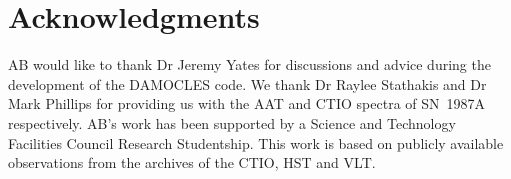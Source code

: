 \documentclass[useAMS,usenatbib,usegraphicx]{mnras}
\begin{document}
%
%
%
%
%
%
%
\section*{Acknowledgments}

AB would like to thank Dr Jeremy Yates for discussions and advice during 
the development of the DAMOCLES code.  We thank Dr Raylee Stathakis and Dr Mark Phillips for 
providing us with the AAT and CTIO spectra of SN~1987A respectively.  AB's work has been 
supported by a Science and Technology Facilities Council Research 
Studentship.  This work is based on publicly available observations from the archives of the CTIO, HST and VLT.

{}

\end{document}
